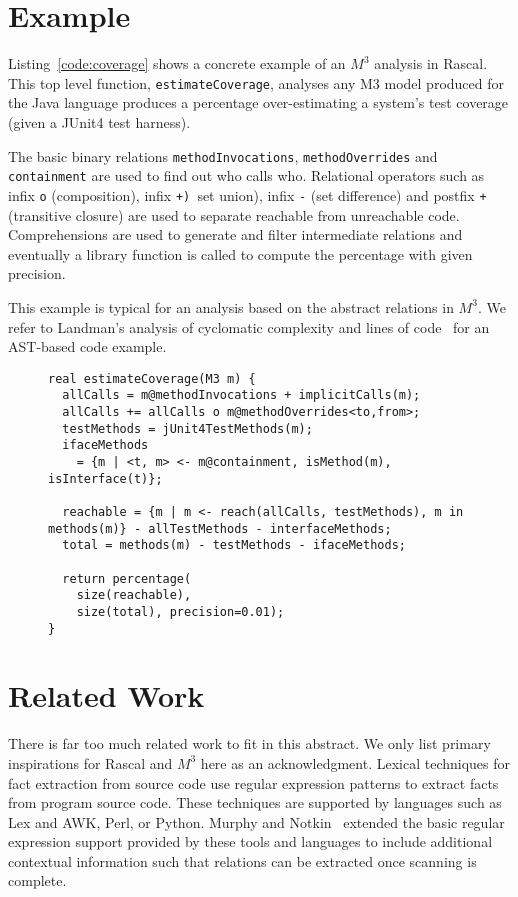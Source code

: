 \documentclass[conference]{IEEEtran}
\newcommand{\mthree}{\ensuremath{M^3}\xspace}
\begin{document}
\section{Example}

Listing~\ref{code:coverage} shows a concrete example of an \mthree analysis in Rascal. This top level function, \lstinline{estimateCoverage}, analyses any M3 model produced for the Java language produces a percentage over-estimating a system's test coverage  (given a JUnit4 test harness). 

The basic binary relations \lstinline{methodInvocations},  \lstinline{methodOverrides} and \lstinline{containment} are used to find out who calls who. Relational operators such as infix \lstinline{o} (composition), infix \lstinline(+) (set union), infix \lstinline{-} (set difference) and postfix \lstinline{+} (transitive closure) are used to separate reachable from unreachable code. Comprehensions are used to generate and filter intermediate relations and eventually a library function is called to compute the percentage with given precision. 

This example is typical for an analysis based on the abstract relations in \mthree. We refer to Landman's analysis of cyclomatic complexity and lines of code~\cite{davy} for an AST-based code example.

\begin{figure}[t]
\begin{lstlisting}[caption=Statically estimating test coverage using \mthree., label=code:coverage,language=rascal]
real estimateCoverage(M3 m) {
  allCalls = m@methodInvocations + implicitCalls(m);
  allCalls += allCalls o m@methodOverrides<to,from>;
  testMethods = jUnit4TestMethods(m);
  ifaceMethods 
    = {m | <t, m> <- m@containment, isMethod(m), isInterface(t)};
  
  reachable = {m | m <- reach(allCalls, testMethods), m in methods(m)} - allTestMethods - interfaceMethods;
  total = methods(m) - testMethods - ifaceMethods;
  
  return percentage(
    size(reachable), 
    size(total), precision=0.01);
}
\end{lstlisting}
\end{figure}

\section{Related Work}

There is far too much related work to fit in this abstract. We only list primary inspirations for Rascal and \mthree here as an acknowledgment.
%
Lexical techniques for fact extraction from source code use regular expression patterns to extract facts from
program source code. These techniques are supported by languages such as Lex and AWK, Perl, or Python. Murphy and
Notkin~\cite{MurphyNotkin95,DBLP:journals/tosem/MurphyN96} extended the
basic regular expression support provided by these tools and languages
to include additional contextual information such that relations can be extracted once scanning is complete.
\end{document}
